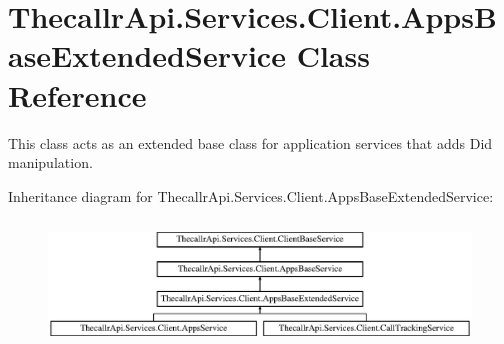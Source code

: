\hypertarget{class_thecallr_api_1_1_services_1_1_client_1_1_apps_base_extended_service}{\section{Thecallr\+Api.\+Services.\+Client.\+Apps\+Base\+Extended\+Service Class Reference}
\label{class_thecallr_api_1_1_services_1_1_client_1_1_apps_base_extended_service}
}


This class acts as an extended base class for application services that adds Did manipulation.  


Inheritance diagram for Thecallr\+Api.\+Services.\+Client.\+Apps\+Base\+Extended\+Service\+:\begin{figure}[H]
\begin{center}
\leavevmode
\includegraphics[height=3.373494cm]{class_thecallr_api_1_1_services_1_1_client_1_1_apps_base_extended_service}
\end{center}
\end{figure}
